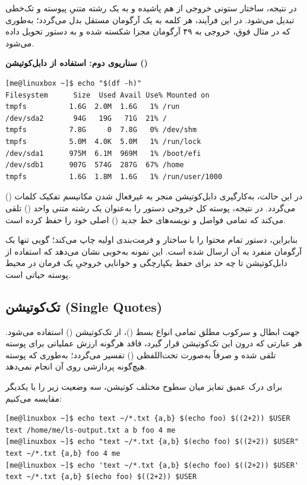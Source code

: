 در نتیجه، ساختار ستونی خروجی از هم پاشیده و به یک رشته متنیِ پیوسته و تک‌خطی تبدیل می‌شود. در این فرآیند، هر کلمه به یک آرگومان مستقل بدل می‌گردد؛ به‌طوری که در مثال فوق، خروجی به ۴۹ آرگومان مجزا شکسته شده و به دستور  تحویل داده می‌شود.

\textbf{سناریوی دوم: استفاده از دابل‌کوتیشن ()}

\begin{latin}
\begin{lstlisting}
[me@linuxbox ~]$ echo "$(df -h)"
Filesystem      Size  Used Avail Use% Mounted on
tmpfs          1.6G  2.0M  1.6G   1% /run
/dev/sda2       94G   19G   71G  21% /
tmpfs          7.8G     0  7.8G   0% /dev/shm
tmpfs          5.0M  4.0K  5.0M   1% /run/lock
/dev/sda1      975M  6.1M  969M   1% /boot/efi
/dev/sdb1      907G  574G  287G  67% /home
tmpfs          1.6G  1.8M  1.6G   1% /run/user/1000
\end{lstlisting}
\end{latin}

در این حالت، به‌کارگیری دابل‌کوتیشن منجر به غیرفعال شدن مکانیسم تفکیک کلمات () می‌گردد. در نتیجه، پوسته کل خروجی دستور  را به‌عنوان یک رشته متنی واحد () تلقی می‌کند که تمامی فواصل و نویسه‌های خط جدید () اصلی خود را حفظ کرده است.

بنابراین، دستور  تمام محتوا را با ساختار و فرمت‌بندی اولیه چاپ می‌کند؛ گویی تنها یک آرگومان منفرد به آن ارسال شده است. این نمونه به‌خوبی نشان می‌دهد که استفاده از دابل‌کوتیشن تا چه حد برای حفظ یکپارچگی و خوانایی خروجیِ یک فرمان در محیط پوسته حیاتی است.

\subsection{تک‌کوتیشن (Single Quotes)}

جهت ابطال و سرکوب مطلق تمامی انواع بسط ()، از تک‌کوتیشن () استفاده می‌شود. هر عبارتی که درون این تک‌کوتیشن قرار گیرد، فاقد هرگونه ارزش عملیاتی برای پوسته تلقی شده و صرفاً به‌صورت تحت‌اللفظی () تفسیر می‌گردد؛ به‌طوری که پوسته هیچ‌گونه پردازشی روی آن انجام نمی‌دهد.

برای درک عمیق تمایز میان سطوح مختلف کوتیشن، سه وضعیت زیر را با یکدیگر مقایسه می‌کنیم:

\begin{latin}
\begin{lstlisting}
[me@linuxbox ~]$ echo text ~/*.txt {a,b} $(echo foo) $((2+2)) $USER
text /home/me/ls-output.txt a b foo 4 me
[me@linuxbox ~]$ echo "text ~/*.txt {a,b} $(echo foo) $((2+2)) $USER"
text ~/*.txt {a,b} foo 4 me
[me@linuxbox ~]$ echo 'text ~/*.txt {a,b} $(echo foo) $((2+2)) $USER'
text ~/*.txt {a,b} $(echo foo) $((2+2)) $USER
\end{lstlisting}
\end{latin}

